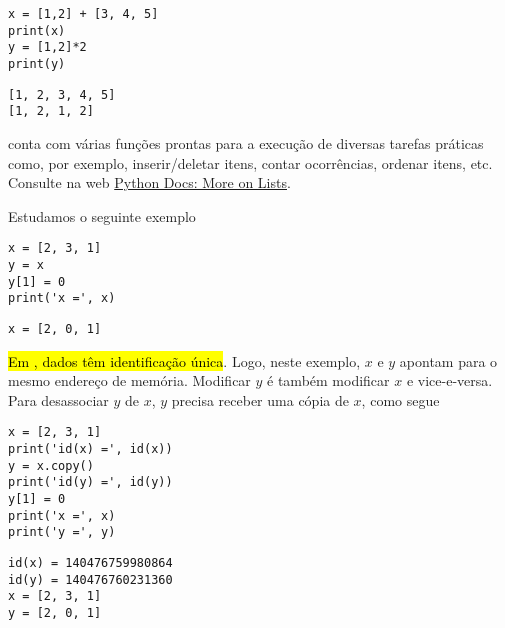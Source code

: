 \documentclass[12pt]{article}
\begin{document}
\begin{lstlisting}
x = [1,2] + [3, 4, 5]
print(x)
y = [1,2]*2
print(y)
\end{lstlisting}

\begin{verbatim}
[1, 2, 3, 4, 5]
[1, 2, 1, 2]
\end{verbatim}

\begin{obs}
  {\PYTHONlist} conta com várias funções prontas para a execução de diversas tarefas práticas como, por exemplo, inserir/deletar itens, contar ocorrências, ordenar itens, etc. Consulte na web \href{https://docs.python.org/3/tutorial/datastructures.html#more-on-lists}{Python Docs: More on Lists}.
\end{obs}

\begin{obs}
  Estudamos o seguinte exemplo

\begin{lstlisting}
x = [2, 3, 1]
y = x
y[1] = 0
print('x =', x)
\end{lstlisting}

\begin{verbatim}
x = [2, 0, 1]
\end{verbatim}

  \hl{Em {\python}, dados têm identificação única}. Logo, neste exemplo, $x$ e $y$ apontam para o mesmo endereço de memória. Modificar $y$ é também modificar $x$ e vice-e-versa. Para desassociar $y$ de $x$, $y$ precisa receber uma cópia de $x$, como segue

\begin{lstlisting}
x = [2, 3, 1]
print('id(x) =', id(x))
y = x.copy()
print('id(y) =', id(y))
y[1] = 0
print('x =', x)
print('y =', y)
\end{lstlisting}

\begin{verbatim}
id(x) = 140476759980864
id(y) = 140476760231360
x = [2, 3, 1]
y = [2, 0, 1]
\end{verbatim}

\end{obs}
\end{document}
